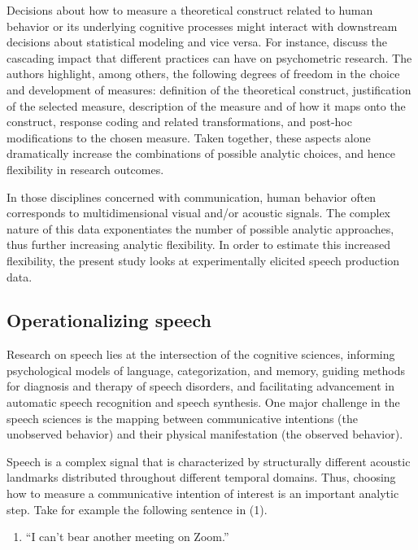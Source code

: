 \documentclass[Review,times,sageh]{sagej}
\providecommand{\tightlist}{\setlength{\itemsep}{0pt}\setlength{\parskip}{0pt}}
\begin{document}
Decisions about how to measure a theoretical construct related to human behavior or its underlying cognitive processes might interact with downstream decisions about statistical modeling and vice versa.
For instance, \citet{flake2020} discuss the cascading impact that different practices can have on psychometric research.
The authors highlight, among others, the following degrees of freedom in the choice and development of measures: definition of the theoretical construct, justification of the selected measure, description of the measure and of how it maps onto the construct, response coding and related transformations, and post-hoc modifications to the chosen measure.
Taken together, these aspects alone dramatically increase the combinations of possible analytic choices, and hence flexibility in research outcomes.

In those disciplines concerned with communication, human behavior often corresponds to multidimensional visual and/or acoustic signals.
The complex nature of this data exponentiates the number of possible analytic approaches, thus further increasing analytic flexibility.
In order to estimate this increased flexibility, the present study looks at experimentally elicited speech production data.\\

\hypertarget{s:operspeech}{%
\subsection{Operationalizing speech}\label{s:operspeech}}

Research on speech lies at the intersection of the cognitive sciences, informing psychological models of language, categorization, and memory, guiding methods for diagnosis and therapy of speech disorders, and facilitating advancement in automatic speech recognition and speech synthesis.
One major challenge in the speech sciences is the mapping between communicative intentions (the unobserved behavior) and their physical manifestation (the observed behavior).

Speech is a complex signal that is characterized by structurally different acoustic landmarks distributed throughout different temporal domains.
Thus, choosing how to measure a communicative intention of interest is an important analytic step.
Take for example the following sentence in (1).

\vspace{1em}

\begin{enumerate}
\def\labelenumi{(\arabic{enumi})}
\tightlist
\item
  ``I can't bear another meeting on Zoom.''
  \vspace{1em}
\end{enumerate}
\end{document}
